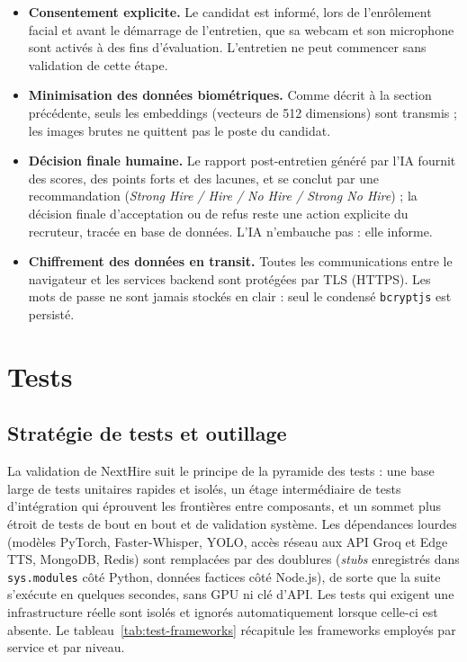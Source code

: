 \begin{itemize}
  \item \textbf{Consentement explicite.} Le candidat est informé, lors de l'enrôlement facial
        et avant le démarrage de l'entretien, que sa webcam et son microphone sont activés
        à des fins d'évaluation. L'entretien ne peut commencer sans validation de cette étape.
  \item \textbf{Minimisation des données biométriques.} Comme décrit à la section précédente,
        seuls les embeddings (vecteurs de 512 dimensions) sont transmis ; les images brutes ne
        quittent pas le poste du candidat.
  \item \textbf{Décision finale humaine.} Le rapport post-entretien généré par l'IA fournit
        des scores, des points forts et des lacunes, et se conclut par une recommandation
        (\textit{Strong Hire / Hire / No Hire / Strong No Hire}) ; la décision finale
        d'acceptation ou de refus reste une action explicite du recruteur, tracée en base de
        données. L'IA n'embauche pas : elle informe.
  \item \textbf{Chiffrement des données en transit.} Toutes les communications entre le
        navigateur et les services backend sont protégées par TLS (HTTPS). Les mots de
        passe ne sont jamais stockés en clair : seul le condensé \texttt{bcryptjs} est
        persisté.
\end{itemize}

\section{Tests}

\subsection{Stratégie de tests et outillage}

La validation de NextHire suit le principe de la pyramide des tests : une base large de tests
unitaires rapides et isolés, un étage intermédiaire de tests d'intégration qui éprouvent les
frontières entre composants, et un sommet plus étroit de tests de bout en bout et de validation
système. Les dépendances lourdes (modèles PyTorch, Faster-Whisper, YOLO, accès réseau aux
API Groq et Edge TTS, MongoDB, Redis) sont remplacées par des doublures
(\textit{stubs} enregistrés dans \texttt{sys.modules} côté Python, données factices côté
Node.js), de sorte que la suite s'exécute en quelques secondes, sans GPU ni clé d'API. Les
tests qui exigent une infrastructure réelle sont isolés et ignorés automatiquement lorsque
celle-ci est absente. Le tableau~\ref{tab:test-frameworks} récapitule les frameworks employés
par service et par niveau.


